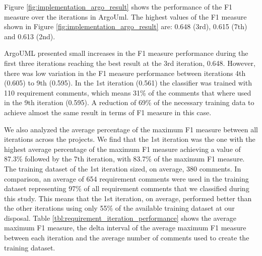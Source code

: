 Figure \ref{fig:implementation_argo_result} shows the performance of the F1 measure over the iterations in ArgoUml. The highest values of the F1 measure shown in Figure \ref{fig:implementation_argo_result} are: 0.648 (3rd), 0.615 (7th) and 0.613 (2nd).

ArgoUML presented small increases in the F1 measure performance during the first three iterations reaching the best result at the 3rd iteration, 0.648. However, there was low variation in the F1 measure performance between iterations 4th (0.605) to 9th (0.595). In the 1st iteration (0.561) the classifier was trained with 110 requirement \SATD comments, which means 31\% of the comments that where used in the 9th iteration (0.595). A reduction of 69\% of the necessary training data to achieve almost the same result in terms of F1 measure in this case. 

We also analyzed the average percentage of the maximum F1 measure between all iterations across the projects. We find that the 1st iteration was the one with the highest average percentage of the maximum F1 measure achieving a value of 87.3\% followed by the 7th iteration, with 83.7\% of the maximum F1 measure. The training dataset of the 1st iteration sized, on average, 380 \SATD comments. In comparison, an average of 654 requirement \SATD comments were used in the training dataset representing 97\% of all requirement \SATD comments that we classified during this study. This means that the 1st iteration, on average, performed better than the other iterations using only 55\% of the available training dataset at our disposal. Table \ref{tbl:requirement_iteration_performance} shows the average maximum F1 measure, the delta interval of the average maximum F1 measure between each iteration and the average number of comments used to create the training dataset. 

